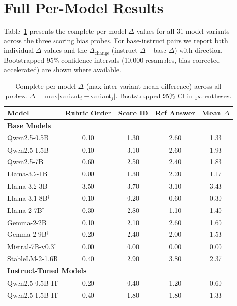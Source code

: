 \section{Full Per-Model Results}
\label{app:full_results}

Table~\ref{tab:all_model_deltas} presents the complete per-model $\Delta$ values for all 31 model variants across the three scoring bias probes. For base-instruct pairs we report both individual $\Delta$ values and the $\Delta_{\text{change}}$ (instruct $\Delta$ -- base $\Delta$) with direction. Bootstrapped 95\% confidence intervals (10,000 resamples, bias-corrected accelerated) are shown where available.

\begin{table}[h]
\centering\small
\caption{Complete per-model $\Delta$ (max inter-variant mean difference) across all probes. $\Delta$ = max$|$variant$_i - $variant$_j|$. Bootstrapped 95\% CI in parentheses.}
\label{tab:all_model_deltas}
\begin{tabular}{lcccc}
\toprule
\textbf{Model} & \textbf{Rubric Order} & \textbf{Score ID} & \textbf{Ref Answer} & \textbf{Mean $\Delta$} \\
\midrule
\multicolumn{5}{l}{\textbf{Base Models}} \\
\midrule
Qwen2.5-0.5B & 0.10 & 1.30 & 2.60 & 1.33 \\
Qwen2.5-1.5B & 0.10 & 3.10 & 2.60 & 1.93 \\
Qwen2.5-7B & 0.60 & 2.50 & 2.40 & 1.83 \\
Llama-3.2-1B & 0.00 & 1.30 & 2.20 & 1.17 \\
Llama-3.2-3B & 3.50 & 3.70 & 3.10 & 3.43 \\
Llama-3.1-8B$^\dagger$ & 0.10 & 0.20 & 0.60 & 0.30 \\
Llama-2-7B$^\dagger$ & 0.30 & 2.80 & 1.10 & 1.40 \\
Gemma-2-2B & 0.10 & 2.10 & 2.60 & 1.60 \\
Gemma-2-9B$^\dagger$ & 0.20 & 2.40 & 2.00 & 1.53 \\
Mistral-7B-v0.3$^\dagger$ & 0.00 & 0.00 & 0.00 & 0.00 \\
StableLM-2-1.6B & 0.40 & 2.90 & 3.80 & 2.37 \\
\midrule
\multicolumn{5}{l}{\textbf{Instruct-Tuned Models}} \\
\midrule
Qwen2.5-0.5B-IT & 0.20 & 0.40 & 1.20 & 0.60 \\
Qwen2.5-1.5B-IT & 0.40 & 1.80 & 1.80 & 1.33 \\

\end{tabular}
\end{table}
